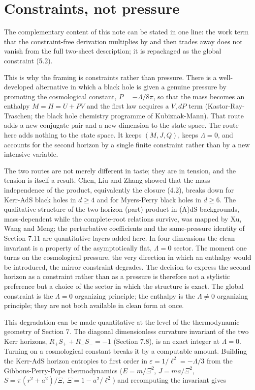 \documentclass[11pt]{article}
\begin{document}
\section{Constraints, not pressure}

The complementary content of this note can be stated in one line: the work term that the constraint-free derivation multiplies by and then trades away does not vanish from the full two-sheet description; it is repackaged as the global constraint (5.2).

This is why the framing is constraints rather than pressure. There is a well-developed alternative in which a black hole is given a genuine pressure by promoting the cosmological constant, $P = -\Lambda/8\pi$, so that the mass becomes an enthalpy $M = H = U + PV$ and the first law acquires a $V,dP$ term (Kastor-Ray-Traschen; the black hole chemistry programme of Kubiznak-Mann). That route adds a new conjugate pair and a new dimension to the state space. The route here adds nothing to the state space. It keeps $(M,J,Q)$, keeps $\Lambda = 0$, and accounts for the second horizon by a single finite constraint rather than by a new intensive variable.

The two routes are not merely different in taste; they are in tension, and the tension is itself a result. Chen, Liu and Zhang showed that the mass-independence of the product, equivalently the closure (4.2), breaks down for Kerr-AdS black holes in $d \ge 4$ and for Myers-Perry black holes in $d \ge 6$. The qualitative structure of the two-horizon (part) product in (A)dS backgrounds, mass-dependent while the complete-root relations survive, was mapped by Xu, Wang and Meng; the perturbative coefficients and the same-pressure identity of Section 7.11 are quantitative layers added here. In four dimensions the clean invariant is a property of the asymptotically flat, $\Lambda = 0$ sector. The moment one turns on the cosmological pressure, the very direction in which an enthalpy would be introduced, the mirror constraint degrades. The decision to express the second horizon as a constraint rather than as a pressure is therefore not a stylistic preference but a choice of the sector in which the structure is exact. The global constraint is the $\Lambda = 0$ organizing principle; the enthalpy is the $\Lambda \ne 0$ organizing principle; they are not both available in clean form at once.

This degradation can be made quantitative at the level of the thermodynamic geometry of Section 7. The diagonal dimensionless curvature invariant of the two Kerr horizons, $R_+S_+ + R_-S_- = -1$ (Section 7.8), is an exact integer at $\Lambda = 0$. Turning on a cosmological constant breaks it by a computable amount. Building the Kerr-AdS horizon entropies to first order in $\varepsilon = 1/\ell^2 = -\Lambda/3$ from the Gibbons-Perry-Pope thermodynamics ($E = m/\Xi^2$, $J = ma/\Xi^2$, $S = \pi(r^2+a^2)/\Xi$, $\Xi = 1 - a^2/\ell^2$) and recomputing the invariant gives
\end{document}
